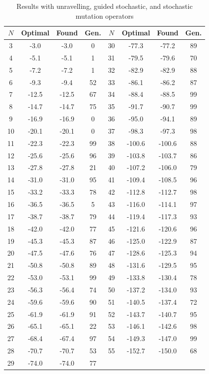 \documentclass{article}
\begin{document}
\begin{table}[]
	\label {tab:nosa}
	\centering
	\begin{tabular}{cccc|cccc}
	$N$  & Optimal & Found & Gen. & $N$  & Optimal & Found  & Gen. \\
	\hline
	3  & -3.0    & -3.0  & 0    & 30 & -77.3   & -77.2  & 89   \\
	4  & -5.1    & -5.1  & 1    & 31 & -79.5   & -79.6  & 70   \\
	5  & -7.2    & -7.2  & 1    & 32 & -82.9   & -82.9  & 88   \\
	6  & -9.3    & -9.4  & 52   & 33 & -86.1   & -86.2  & 87   \\
	7  & -12.5   & -12.5 & 67   & 34 & -88.4   & -88.5  & 99   \\
	8  & -14.7   & -14.7 & 75   & 35 & -91.7   & -90.7  & 99   \\
	9  & -16.9   & -16.9 & 0    & 36 & -95.0   & -94.1  & 89   \\
	10 & -20.1   & -20.1 & 0    & 37 & -98.3   & -97.3  & 98   \\
	11 & -22.3   & -22.3 & 99   & 38 & -100.6  & -100.6 & 88   \\
	12 & -25.6   & -25.6 & 96   & 39 & -103.8  & -103.7 & 86   \\
	13 & -27.8   & -27.8 & 21   & 40 & -107.2  & -106.0 & 79   \\
	14 & -31.0   & -31.0 & 95   & 41 & -109.4  & -108.5 & 96   \\
	15 & -33.2   & -33.3 & 78   & 42 & -112.8  & -112.7 & 98   \\
	16 & -36.5   & -36.5 & 5    & 43 & -116.0  & -114.1 & 97   \\
	17 & -38.7   & -38.7 & 79   & 44 & -119.4  & -117.3 & 93   \\
	18 & -42.0   & -42.0 & 77   & 45 & -121.6  & -120.6 & 96   \\
	19 & -45.3   & -45.3 & 87   & 46 & -125.0  & -122.9 & 87   \\
	20 & -47.5   & -47.6 & 76   & 47 & -128.6  & -125.3 & 94   \\
	21 & -50.8   & -50.8 & 89   & 48 & -131.6  & -129.5 & 95   \\
	22 & -53.0   & -53.1 & 99   & 49 & -133.8  & -130.4 & 78   \\
	23 & -56.3   & -56.4 & 74   & 50 & -137.2  & -134.0 & 93   \\
	24 & -59.6   & -59.6 & 90   & 51 & -140.5  & -137.4 & 72   \\
	25 & -61.9   & -61.9 & 91   & 52 & -143.7  & -140.7 & 95   \\
	26 & -65.1   & -65.1 & 22   & 53 & -146.1  & -142.6 & 98   \\
	27 & -68.4   & -67.4 & 97   & 54 & -149.3  & -147.0 & 99   \\
	28 & -70.7   & -70.7 & 53   & 55 & -152.7  & -150.0 & 68   \\
	29 & -74.0   & -74.0 & 77   &    &         &        &      \\

	\hline 
	\end{tabular}
	\caption{Results with unravelling, guided stochastic, and stochastic
	mutation
	operators}
 \end{table}
\end{document}
